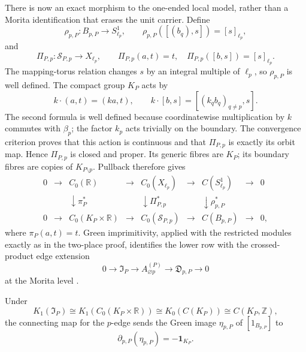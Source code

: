 There is now an exact morphism to the one-ended local model, rather than a
Morita identification that erases the unit carrier.  Define
\[
 \rho_{p,P}:B_{p,P}\to S^1_{\ell_p},\qquad
 \rho_{p,P}([(b_q),s])=[s]_{\ell_p},
\]
and
\begin{equation}
 \Pi_{P,p}:\mathcal S_{P,p}\to X_{\ell_p},\qquad
 \Pi_{P,p}(a,t)=t,\quad
 \Pi_{P,p}([b,s])=[s]_{\ell_p}.
 \label{eq:multiplace-to-local-quotient}
\end{equation}
The mapping-torus relation changes $s$ by an integral multiple of $\ell_p$,
so $\rho_{p,P}$ is well defined.  The compact group $K_P$ acts by
\[
 k\cdot(a,t)=(ka,t),\qquad
 k\cdot[b,s]=[(k_qb_q)_{q\ne p},s].
\]
The second formula is well defined because coordinatewise multiplication by
$k$ commutes with $\beta_p$; the factor $k_p$ acts trivially on the boundary.
The convergence criterion proves that this action is continuous and that
$\Pi_{P,p}$ is exactly its orbit map.  Hence $\Pi_{P,p}$ is closed and proper.
Its generic fibres are $K_P$; its boundary fibres are copies of
$K_{P\setminus p}$.  Pullback therefore gives
\begin{equation}
\begin{array}{ccccccccc}
0&\to&C_0(\mathbb R)&\to&C_0(X_{\ell_p})&\to&C(S^1_{\ell_p})&\to&0\\
&&\downarrow\scriptstyle{\pi_P^*}&&\downarrow\scriptstyle{\Pi_{P,p}^*}
&&\downarrow\scriptstyle{\rho_{p,P}^*}\\
0&\to&C_0(K_P\times\mathbb R)&\to&C_0(\mathcal S_{P,p})
&\to&C(B_{p,P})&\to&0,
\end{array}
\label{eq:multiplace-finite-pullback-diagram}
\end{equation}
where $\pi_P(a,t)=t$.  Green imprimitivity, applied with the restricted
modules exactly as in the two-place proof, identifies the lower row with the
crossed-product edge extension
\[
 0\to\mathfrak I_P\to A_{\varnothing p}^{(P)}
 \to\mathfrak D_{p,P}\to0
\]
at the Morita level
\cite[Theorem~1.3.22]{meslandSengun2025}.

\begin{corollary}
\label{cor:multiplace-finite-boundary-class}
Under
\[
 K_1(\mathfrak I_P)\cong
 K_1(C_0(K_P\times\mathbb R))
 \cong K_0(C(K_P))\cong C(K_P,\mathbb Z),
\]
the connecting map for the $p$-edge sends the Green image
$\eta_{p,P}$ of $[1_{B_{p,P}}]$ to
\begin{equation}
 \partial_{p,P}(\eta_{p,P})=-\mathbf1_{K_P}.
 \label{eq:multiplace-finite-boundary-class}
\end{equation}
\end{corollary}

